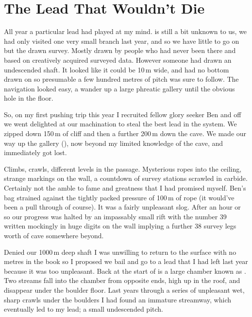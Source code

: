 \section{The Lead That Wouldn't Die}
\label{sec:fenestrator}
    
\label{sec:bigshaft}
All year a particular lead had played at my mind.  is still a bit unknown to us, we had only visited one very small branch last year, and so we have little to go on but the drawn survey. Mostly drawn by people who had never been there and based on creatively acquired surveyed data. However someone had drawn an undescended shaft. It looked like it could be 10\,m wide, and had no bottom drawn on so presumable a few hundred metres of pitch was sure to follow. The navigation looked easy, a wander up a large phreatic gallery until the obvious hole in the floor.

So, on my first pushing trip this year I recruited fellow glory seeker Ben and off we went delighted at our machination to steal the best lead in the system. We zipped down 150\,m of cliff and then a further 200\,m down the cave. We made our way up the gallery (), now beyond my limited knowledge of the cave, and immediately got lost.
 
Climbs, crawls, different levels in the passage. Mysterious ropes into the ceiling, strange markings on the wall, a countdown of survey stations scrawled in carbide. Certainly not the amble to fame and greatness that I had promised myself.  Ben's bag strained against the tightly packed pressure of 100\,m of rope (it would've been a pull through of course). It was a fairly unpleasant slog. After an hour or so our progress was halted by an impassably small rift with the number 39 written mockingly in huge digits on the wall implying a further 38 survey legs worth of cave somewhere beyond. 
 
Denied our 1000\,m deep shaft I was unwilling to return to the surface with no metres in the book so I proposed we bail and go to a lead that I had left last year because it was too unpleasant. Back at the start of  is a large chamber known as . Two streams fall into the chamber from opposite ends, high up in the roof, and disappear under the boulder floor. Last years through a series of unpleasant wet, sharp crawls under the boulders I had found an immature streamway, which eventually led to my lead; a small undescended pitch.
 
